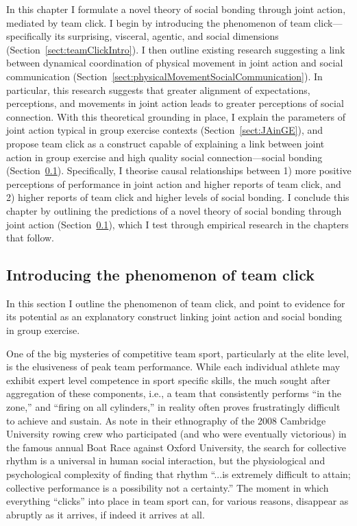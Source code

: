 \begin{CJK}{UTF8}{gbsn}
In this chapter I formulate a novel theory of social bonding through joint action, mediated by team click.  I begin by introducing the phenomenon of team click---specifically its surprising, visceral, agentic, and social dimensions (Section~\ref{sect:teamClickIntro}).  I then outline existing research suggesting a link between dynamical coordination of physical movement in joint action and social communication (Section~\ref{sect:physicalMovementSocialCommunication}). In particular, this research suggests that greater alignment of expectations, perceptions, and movements in joint action leads to greater perceptions of social connection.  With this theoretical grounding in place, I explain the parameters of joint action typical in group exercise contexts (Section~\ref{sect:JAinGE}), and propose team click as a construct capable of explaining a link between joint action in group exercise and high quality social connection---social bonding (Section~\ref{}).  Specifically, I theorise causal relationships between 1) more positive perceptions of performance in joint action and higher reports of team click, and 2) higher reports of team click and higher levels of social bonding.  I conclude this chapter by outlining the predictions of a novel theory of social bonding through joint action (Section~\ref{}), which I test through empirical research in the chapters that follow.


\subsection{Introducing the phenomenon of team click \label{sect:teamClickIntro}}
In this section I outline the phenomenon of team click, and point to evidence for its potential as an explanatory construct linking joint action and social bonding in group exercise.

One of the big mysteries of competitive team sport, particularly at the elite level, is the elusiveness of peak team performance.  While each individual athlete may exhibit expert level competence in sport specific skills, the much sought after aggregation of these components, i.e., a team that consistently performs ``in the zone,'' and ``firing on all cylinders,'' in reality often proves frustratingly difficult to achieve and sustain.  As \textcite[568]{King2011} note in their ethnography of the 2008 Cambridge University rowing crew who participated (and who were eventually victorious) in the famous annual Boat Race against Oxford University, the search for collective rhythm is a universal in human social interaction, but  the physiological and psychological complexity of finding that rhythm ``...is extremely difficult to attain; collective performance is a possibility not a certainty.''   The moment in which everything ``clicks'' into place in team sport can, for various reasons, disappear as abruptly as it arrives, if indeed it arrives at all.


\end{CJK}
